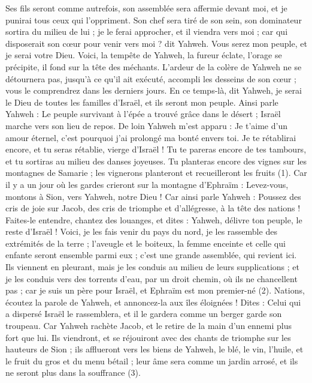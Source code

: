 \begin{multicols}{2}
Ses fils seront comme autrefois, son assemblée sera affermie devant moi, et je punirai tous ceux qui l'oppriment.
Son chef sera tiré de son sein,  son dominateur sortira du milieu de lui ; je le ferai approcher, et il viendra vers moi ; car qui disposerait son cœur pour venir vers moi ? dit Yahweh.
Vous serez mon peuple, et je serai votre Dieu.
Voici, la tempête de Yahweh, la fureur éclate, l’orage se précipite, il fond sur la tête des méchants.
L'ardeur de la colère de Yahweh ne se détournera pas, jusqu’à ce qu'il ait exécuté, accompli les desseins de son cœur ; vous le comprendrez dans les derniers jours.
\VerseOne{}En ce temps-là, dit Yahweh, je serai le Dieu de toutes les familles d'Israël, et ils seront mon peuple.
Ainsi parle Yahweh : Le peuple survivant à l'épée a trouvé grâce dans le désert ; Israël marche vers son lieu de repos.
De loin Yahweh m'est apparu : Je t'aime d'un amour éternel, c'est pourquoi j'ai prolongé ma bonté envers toi.
Je te rétablirai encore, et tu seras rétablie, vierge d'Israël ! Tu te pareras encore de tes tambours, et tu sortiras au milieu des danses joyeuses.
Tu planteras encore des vignes sur les montagnes de Samarie ; les vignerons planteront et  recueilleront les fruits\FTNT{} (1).
Car il y a un jour où les gardes crieront sur la montagne d'Ephraïm : Levez-vous, montons à Sion, vers Yahweh, notre Dieu !
Car ainsi parle Yahweh : Poussez des cris de joie sur Jacob, des cris de triomphe et d’allégresse, à la tête des nations ! Faites-le entendre, chantez des louanges, et dites : Yahweh, délivre ton peuple, le reste d'Israël !
Voici, je les fais venir du pays du nord, je les rassemble des extrémités de la terre ; l'aveugle et le boiteux, la femme enceinte et celle qui enfante seront ensemble parmi eux ; c’est une grande assemblée, qui revient ici.
Ils viennent en pleurant, mais je les conduis au milieu de leurs supplications ; et je les conduis vers des torrents d'eau, par un droit chemin, où ils ne chancellent pas ; car je suis un père pour Israël, et Ephraïm est mon premier-né\FTNT{} (2).
Nations, écoutez la parole de Yahweh, et annoncez-la aux îles éloignées ! Dites : Celui qui a dispersé Israël le rassemblera, et il le gardera comme un berger garde son troupeau.
Car Yahweh rachète Jacob, et le retire de la main d'un ennemi plus fort que lui.
Ils viendront, et se réjouiront avec des chants de triomphe sur les hauteurs de Sion ; ils afflueront vers les biens de Yahweh, le blé, le vin, l'huile, et le fruit du gros et du menu bétail ;  leur âme sera comme un jardin arrosé, et ils ne seront plus dans la souffrance\FTNT{} (3).

\end{multicols}
